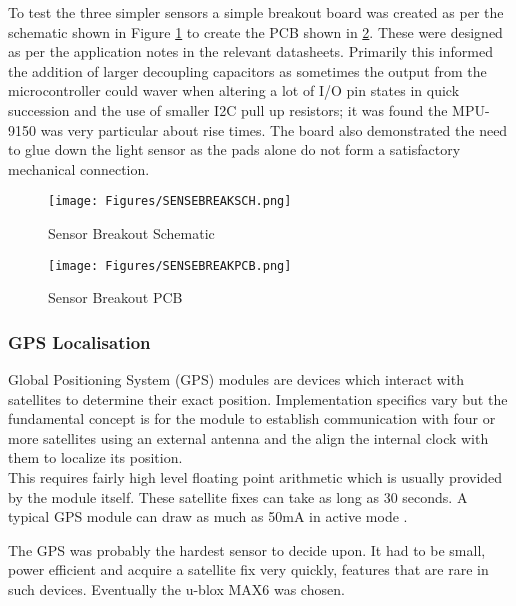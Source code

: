 \documentclass[12pt,openany,a4paper]{book}
\begin{document}
			To test the three simpler sensors a simple breakout board was created as per the schematic shown in Figure \ref{fig:SENSEBREAKSCH} to create the PCB shown in \ref{fig:SENSEBREAKPCB}. These were designed as per the application notes in the relevant datasheets. Primarily this informed the addition of larger decoupling capacitors as sometimes the output from the microcontroller could waver when altering a lot of I/O pin states in quick succession and the use of smaller I2C pull up resistors; it was found the MPU-9150 was very particular about rise times. The board also demonstrated the need to glue down the light sensor as the pads alone do not form a satisfactory mechanical connection.
			
			\begin{figure}[H]
				\centering
				\texttt{[image: Figures/SENSEBREAKSCH.png]}
				\caption{Sensor Breakout Schematic}
				\label{fig:SENSEBREAKSCH}
			\end{figure}		
			
			\begin{figure}[H]
				\centering
				\texttt{[image: Figures/SENSEBREAKPCB.png]}
				\caption{Sensor Breakout PCB}
				\label{fig:SENSEBREAKPCB}
			\end{figure}		
			
\newpage
			\subsubsection{GPS Localisation}
			Global Positioning System (GPS) modules are devices which interact with satellites to determine their exact position. Implementation specifics vary but the fundamental concept is for the module to establish communication with four or more satellites using an external antenna and the align the internal clock with them to localize its position. \\
						
			This requires fairly high level floating point arithmetic which is usually provided by the module itself. These satellite fixes can take as long as 30 seconds. A typical GPS module can draw as much as 50mA in active mode \cite{Carroll10}.
						
			The GPS was probably the hardest sensor to decide upon. It had to be small, power efficient and acquire a satellite fix very quickly, features that are rare in such devices. Eventually the u-blox MAX6 \cite{ubloxGPS} was chosen. \\
			
\end{document}

